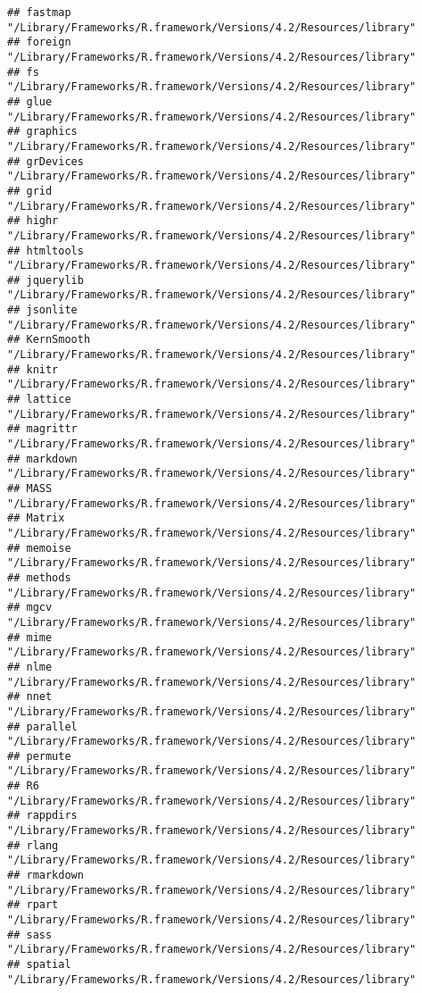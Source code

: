 \documentclass[
]{article}
\begin{document}
\begin{verbatim}
## fastmap    "/Library/Frameworks/R.framework/Versions/4.2/Resources/library"
## foreign    "/Library/Frameworks/R.framework/Versions/4.2/Resources/library"
## fs         "/Library/Frameworks/R.framework/Versions/4.2/Resources/library"
## glue       "/Library/Frameworks/R.framework/Versions/4.2/Resources/library"
## graphics   "/Library/Frameworks/R.framework/Versions/4.2/Resources/library"
## grDevices  "/Library/Frameworks/R.framework/Versions/4.2/Resources/library"
## grid       "/Library/Frameworks/R.framework/Versions/4.2/Resources/library"
## highr      "/Library/Frameworks/R.framework/Versions/4.2/Resources/library"
## htmltools  "/Library/Frameworks/R.framework/Versions/4.2/Resources/library"
## jquerylib  "/Library/Frameworks/R.framework/Versions/4.2/Resources/library"
## jsonlite   "/Library/Frameworks/R.framework/Versions/4.2/Resources/library"
## KernSmooth "/Library/Frameworks/R.framework/Versions/4.2/Resources/library"
## knitr      "/Library/Frameworks/R.framework/Versions/4.2/Resources/library"
## lattice    "/Library/Frameworks/R.framework/Versions/4.2/Resources/library"
## magrittr   "/Library/Frameworks/R.framework/Versions/4.2/Resources/library"
## markdown   "/Library/Frameworks/R.framework/Versions/4.2/Resources/library"
## MASS       "/Library/Frameworks/R.framework/Versions/4.2/Resources/library"
## Matrix     "/Library/Frameworks/R.framework/Versions/4.2/Resources/library"
## memoise    "/Library/Frameworks/R.framework/Versions/4.2/Resources/library"
## methods    "/Library/Frameworks/R.framework/Versions/4.2/Resources/library"
## mgcv       "/Library/Frameworks/R.framework/Versions/4.2/Resources/library"
## mime       "/Library/Frameworks/R.framework/Versions/4.2/Resources/library"
## nlme       "/Library/Frameworks/R.framework/Versions/4.2/Resources/library"
## nnet       "/Library/Frameworks/R.framework/Versions/4.2/Resources/library"
## parallel   "/Library/Frameworks/R.framework/Versions/4.2/Resources/library"
## permute    "/Library/Frameworks/R.framework/Versions/4.2/Resources/library"
## R6         "/Library/Frameworks/R.framework/Versions/4.2/Resources/library"
## rappdirs   "/Library/Frameworks/R.framework/Versions/4.2/Resources/library"
## rlang      "/Library/Frameworks/R.framework/Versions/4.2/Resources/library"
## rmarkdown  "/Library/Frameworks/R.framework/Versions/4.2/Resources/library"
## rpart      "/Library/Frameworks/R.framework/Versions/4.2/Resources/library"
## sass       "/Library/Frameworks/R.framework/Versions/4.2/Resources/library"
## spatial    "/Library/Frameworks/R.framework/Versions/4.2/Resources/library"

\end{verbatim}
\end{document}
